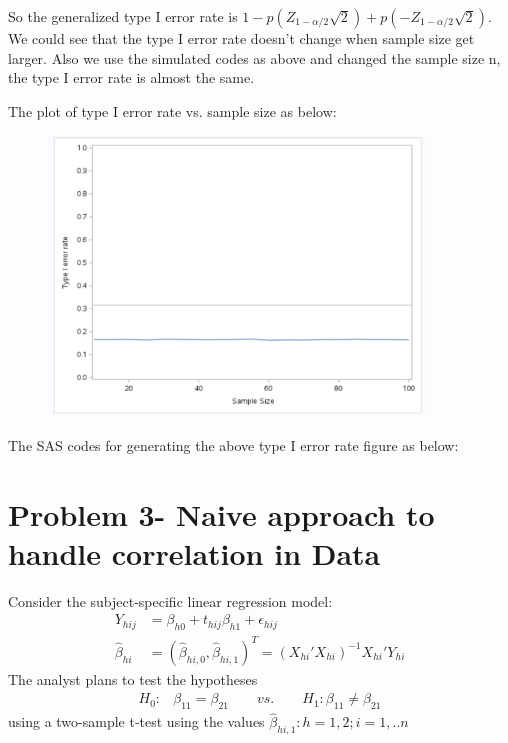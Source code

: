 \begin{itemize}
So the generalized type I error rate is $1 - p(Z_{1-\alpha/2} \sqrt{2}) + p(- Z_{1-\alpha/2} \sqrt{2})$. We could see that the type I error rate doesn't change when sample size get larger.
Also we use the simulated codes as above and changed the sample size n, the type I error rate is almost the same. 
 
The plot of type I error rate vs. sample size as below:
\begin{figure}[h]
	\includegraphics[width=10cm]{HW1-2b.png}
\end{figure}

The SAS codes for generating the above type I error rate figure as below:


\end{itemize}

\section{Problem 3- Naive approach to handle correlation in Data}

Consider the subject-specific linear regression model:
\begin{align*}
	Y_{hij}  &= \beta_{h0} + t_{hij} \beta_{h1} + \epsilon_{hij} \\
	\hat{\beta}_{hi} &= (\hat{\beta}_{hi,0}, \hat{\beta}_{hi,1})^T = (X_{hi}' X_{hi})^{-1} X_{hi}' Y_{hi}
\end{align*}
The analyst plans to test the hypotheses 
\begin{align*}
	H_0:   & \beta_{11} = \beta_{21} \qquad vs. \qquad H_1: \beta_{11} \neq \beta_{21}
\end{align*}
using a two-sample t-test using the values $\hat{\beta}_{hi,1}: h= 1,2 ; i= 1,..n $ 

